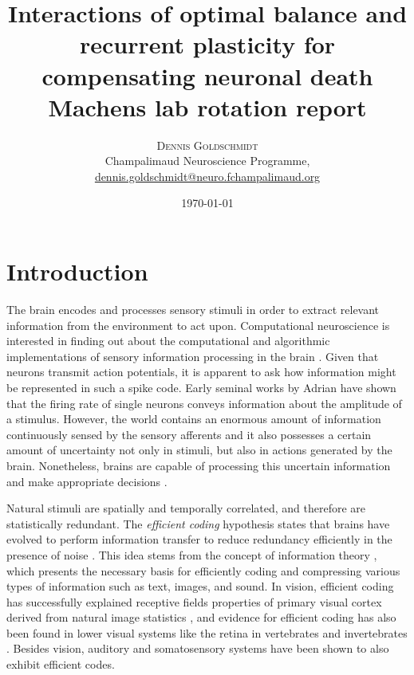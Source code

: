 \documentclass[twoside,twocolumn]{article}
\title{\Large {Interactions of optimal balance and recurrent plasticity for compensating neuronal death} \\[0.25cm] \small{Machens lab rotation report}} %
\author{%
\textsc{Dennis Goldschmidt} \\[1ex] %
\normalsize Champalimaud Neuroscience Programme,  \\ %
\normalsize \href{mailto:dennis.goldschmidt@neuro.fchampalimaud.org}{dennis.goldschmidt@neuro.fchampalimaud.org} %
}
\date{\today} %
\begin{document}
\maketitle


\section{Introduction}

The brain encodes and processes sensory stimuli in order to extract relevant information from the environment to act upon. Computational neuroscience is interested in finding out about the computational and algorithmic implementations of sensory information processing in the brain \cite{Marr1982}. Given that neurons transmit action potentials, it is apparent to ask how information might be represented in such a spike code. Early seminal works by Adrian \cite{Adrian1926} have shown that the firing rate of single neurons conveys information about the amplitude of a stimulus. However, the world contains an enormous amount of information continuously sensed by the sensory afferents and it also possesses a certain amount of uncertainty not only in stimuli, but also in actions generated by the brain. Nonetheless, brains are capable of processing this uncertain information and make appropriate decisions \cite{Ernst2002, Behrens2007, Drugowitsch2014}.  

Natural stimuli are spatially and temporally correlated, and therefore are statistically redundant. The \textit{efficient coding} hypothesis states that brains have evolved to perform information transfer to reduce redundancy efficiently in the presence of noise \cite{Attneave1954, Barlow1961}. This idea stems from the concept of information theory \cite{Shannon1948}, which presents the necessary basis for efficiently coding and compressing various types of information such as text, images, and sound. In vision, efficient coding has successfully explained receptive fields properties of primary visual cortex derived from natural image statistics \cite{Olshausen1996, Bell1997}, and evidence for efficient coding has also been found in lower visual systems like the retina in vertebrates \cite{Atick1992, Pitkow2012} and invertebrates \cite{Srinivasan1982, VanHateren1992}. Besides vision, auditory \citep{Smith2006} and somatosensory systems \cite{Bale2015} have been shown to also exhibit efficient codes.
\end{document}
